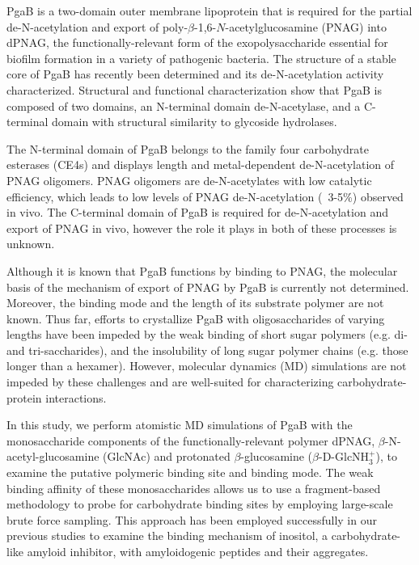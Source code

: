 PgaB is a two-domain outer membrane lipoprotein that is required for the partial de-N-acetylation and export of poly-$\beta$-1,6-$N$-acetylglucosamine (PNAG) into dPNAG, the functionally-relevant form of the exopolysaccharide essential for biofilm formation in a variety of pathogenic bacteria.\cite{Little:2012dp} The structure of a stable core of PgaB has recently been determined and its de-N-acetylation activity characterized.\cite{Little:2012dp, Little:2012go} Structural and functional characterization show that PgaB is composed of two domains, an N-terminal domain de-N-acetylase, and a C-terminal domain with structural similarity to glycoside hydrolases.\cite{Little:2012dp}

The N-terminal domain of PgaB belongs to the family four carbohydrate esterases (CE4s)\cite{Cantarel:2009ff} and displays length and metal-dependent de-N-acetylation of PNAG oligomers.\cite{Little:2012dp} PNAG oligomers are de-N-acetylates with low catalytic efficiency,\cite{Little:2012dp,Nishiyama:2013bb} which leads to low levels of PNAG de-N-acetylation (~3-5\%) observed in vivo.\cite{Itoh:2008dv,Wang:2004wv} The C-terminal domain of PgaB is required for de-N-acetylation and export of PNAG in vivo, however the role it plays in both of these processes is unknown.\cite{Itoh:2008dv}
 
Although it is known that PgaB functions by binding to PNAG, the molecular basis of the mechanism of export of PNAG by PgaB is currently not determined. Moreover, the binding mode and the length of its substrate polymer are not known.  Thus far, efforts to crystallize PgaB with oligosaccharides of varying lengths have been impeded by the weak binding of short sugar polymers (e.g. di- and tri-saccharides), and the insolubility of long sugar polymer chains (e.g. those longer than a hexamer). However, molecular dynamics (MD) simulations are not impeded by these challenges and are well-suited for characterizing carbohydrate-protein interactions.\cite{Fadda:2010p5889}

In this study, we perform atomistic MD simulations of PgaB with the monosaccharide components of the functionally-relevant polymer dPNAG, $\beta$-N-acetyl-glucosamine (GlcNAc) and protonated $\beta$-glucosamine ($\beta$-D-GlcNH$_{3}^{+}$), to examine the putative polymeric binding site and binding mode. The weak binding affinity of these monosaccharides allows us to use a fragment-based methodology to probe for carbohydrate binding sites by employing large-scale brute force sampling. This approach has been employed successfully in our previous studies to examine the binding mechanism of inositol, a carbohydrate-like amyloid inhibitor, with amyloidogenic peptides and their aggregates.\cite{Li:2012bx, Li:2013fo}

